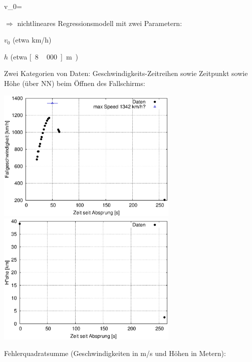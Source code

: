 \begin{landscape}
\begin{center}
\bdm
v_0=
\edm

\vspace{1em}

$\Rightarrow$ nichtlineares Regressionsmodell mit zwei Parametern: 
\parbox{0.8\textwidth}{
\bi
\item $v_0$ (etwa \unit[200]{km/h}) \\[-2em]
\item $h$ (etwa
\unit[8\,000]{m}).
\ei
}


\newpage
\vspace{2ex}

Zwei Kategorien von Daten: Geschwindigkeits-Zeitreihen sowie
Zeitpunkt sowie H\"ohe 
(\"uber NN)  beim \"Offnen des Fallschirms:

\includegraphics[width=0.65\textwidth]{figsFreefall/freefall_vdata.eps}
\includegraphics[width=0.65\textwidth]{figsFreefall/freefall_ydata.eps}

\vspace{3ex}

Fehlerquadratsumme (Geschwindigkeiten in m/s und H\"ohen in Metern):

\vspace{1ex}


\end{center}
\end{landscape}
